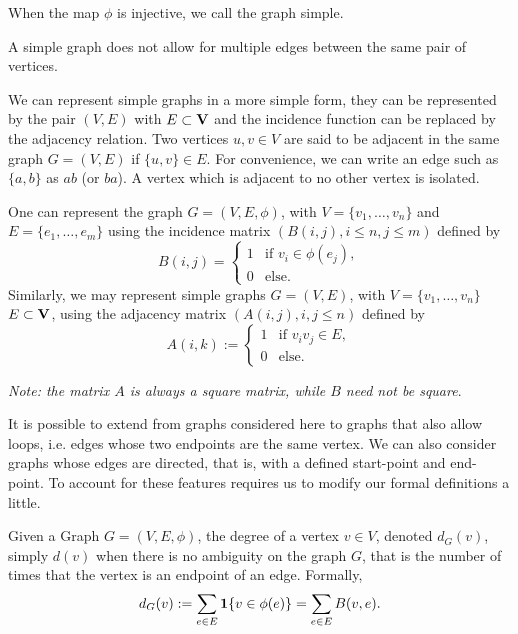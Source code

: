 \documentclass[10pt, a4paper]{article}
\begin{document}
When the map $\phi$ is injective,
we call the graph simple.

A simple graph does not allow for multiple edges between the same pair of vertices.

We can represent simple graphs in a more simple form,
they can be represented by the pair $(V, E)$ with $E \subset \mathbf{V}$ and the incidence function can be replaced by the adjacency relation.
Two vertices $u, v \in V$ are said to be adjacent in the same graph $G = (V, E)$ if $\{u, v\} \in E$.
For convenience,
we can write an edge such as $\{a, b\}$ as $ab$
(or $ba$).
A vertex which is adjacent to no other vertex is isolated.

\begin{remark}
    One can represent the graph $G = (V, E, \phi)$,
    with $V = \{v_1, \dotsc, v_n\}$ and $E = \{e_1, \dotsc, e_m\}$ using the incidence matrix $(B(i, j), i \leq n, j \leq m)$ defined by
    \[
    B(i, j) = \begin{cases}
        1 & \text{if } v_i \in \phi(e_j), \\
        0 &\text{else}.
    \end{cases}
    \]
    Similarly,
    we may represent simple graphs $G = (V, E)$,
    with $V = \{v_1, \dotsc, v_n\}$ $E \subset \mathbf{V}$,
    using the adjacency matrix $(A(i, j), i, j \leq n)$ defined by
    \[
    A(i, k) := \begin{cases}
        1 &\text{if } v_iv_j \in E, \\
        0 &\text{else}.
    \end{cases}
    \]
\end{remark}

\textit{Note:
the matrix $A$ is always a square matrix,
while $B$ need not be square}.

\begin{remark}
    It is possible to extend from graphs considered here to graphs that also allow loops,
    i.e. edges whose two endpoints are the same vertex.
    We can also consider graphs whose edges are directed,
    that is,
    with a defined start-point and end-point.
    To account for these features requires us to modify our formal definitions a little.
\end{remark}

\begin{definition}[Degree]
    Given a Graph $G = (V, E, \phi)$,
    the degree of a vertex $v \in V$,
    denoted $d_G(v)$,
    simply $d(v)$ when there is no ambiguity on the graph $G$,
    that is the number of times that the vertex is an endpoint of an edge.
    Formally,
    \[
    d_G(v) := \sum_{e \in E}\mathbf{1}\{v \in \phi(e)\} = \sum_{e \in E}B(v, e).
    \]
\end{definition}
\end{document}
